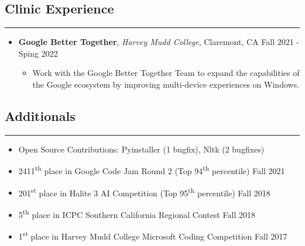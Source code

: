 \documentclass[10pt,letterpaper]{article}
\begin{document}
\subsection*{Clinic Experience}
\vspace{-0.5em}
\hrule
\vspace{1em}
  \begin{itemize}[label={},leftmargin=*]
    \setlength\itemsep{1em}
    \parskip=-0.2em
    \item
    {\textbf{Google Better Together}, \textit{Harvey Mudd College}, Claremont, CA \hfill {Fall 2021 - Sping 2022}}
    \begin{itemize}[label=\textbullet]
      \itemsep0em
        \item  Work with the Google Better Together Team to expand the capabilities of the Google ecosystem by improving multi-device experiences on Windows.
    \end{itemize}
  \end{itemize}


\subsection*{Additionals}
\vspace{-0.2em}
\hrule
\vspace{1em}
  \begin{itemize}[label={},leftmargin=*]
    \setlength\itemsep{0.3em}
    \parskip=-0.2em
    \item
    Open Source Contributions: Pyinstaller (1 bugfix), Nltk (2 bugfixes)
    \item
    2411\textsuperscript{th} place in Google Code Jam Round 2 (Top 94\textsuperscript{th} percentile) \hfill Fall 2021
    \item
    201\textsuperscript{st} place in Halite 3 AI Competition (Top 95\textsuperscript{th} percentile) \hfill Fall 2018
    \item
    5\textsuperscript{th} place in ICPC Southern California Regional Contest \hfill Fall 2018
    \item
    1\textsuperscript{st} place in Harvey Mudd College Microsoft Coding Competition \hfill
    Fall 2017
  \end{itemize}
\end{document}
